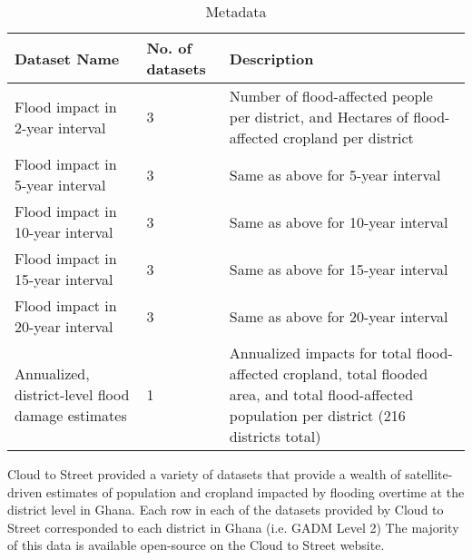 \begin{table}
\centering
\begin{tabular}{|p{4cm}|p{2cm}|p{8cm}|}
\hline
\textbf{Dataset Name} & \textbf{No. of datasets} & \textbf{Description}\\
\hline
Flood impact in 2-year interval & 3 & Number of flood-affected people per district, and Hectares of flood-affected cropland per district\\
Flood impact in 5-year interval & 3 & Same as above for 5-year  interval\\
Flood impact in 10-year interval & 3 & Same as above for 10-year  interval\\
Flood impact in 15-year interval & 3 & Same as above for 15-year  interval\\
Flood impact in 20-year interval & 3 & Same as above for 20-year  interval\\
Annualized, district-level flood damage estimates & 1 & Annualized impacts for total flood-affected cropland, total flooded area, and total flood-affected population per district (216 districts total)\\
\hline
\end{tabular}
\caption{Metadata}
\end{table}

Cloud to Street provided a variety of datasets that provide a wealth of satellite-driven estimates of population and cropland impacted by flooding overtime at the district level in Ghana. Each row in each of the datasets provided by Cloud to Street corresponded to each district in Ghana (i.e. GADM Level 2) The majority of this data is available open-source on the Cloud to Street website.\cite{cloudtostreet}
